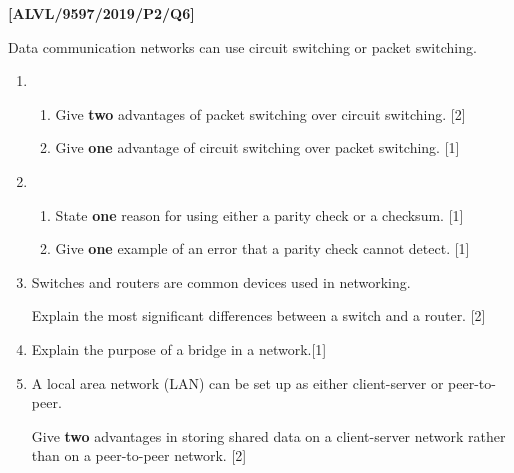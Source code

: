 \item \textbf{{[}ALVL/9597/2019/P2/Q6{]} }

Data communication networks can use circuit switching or packet switching. 
\begin{enumerate}
\item {}
\begin{enumerate}
\item Give \textbf{two} advantages of packet switching over circuit switching.
\hfill{}{[}2{]}
\item Give \textbf{one} advantage of circuit switching over packet switching.
\hfill{}{[}1{]}
\end{enumerate}
\item {} 
\begin{enumerate}
\item State \textbf{one} reason for using either a parity check or a checksum.
\hfill{}{[}1{]}
\item Give \textbf{one} example of an error that a parity check cannot detect.
\hfill{}{[}1{]}
\end{enumerate}
\item Switches and routers are common devices used in networking. 

Explain the most significant differences between a switch and a router.
\hfill{}{[}2{]}
\item Explain the purpose of a bridge in a network.\hfill{}{[}1{]}
\item A local area network (LAN) can be set up as either client-server or
peer-to-peer. 

Give \textbf{two} advantages in storing shared data on a client-server
network rather than on a peer-to-peer network. \hfill{}{[}2{]}
\end{enumerate}